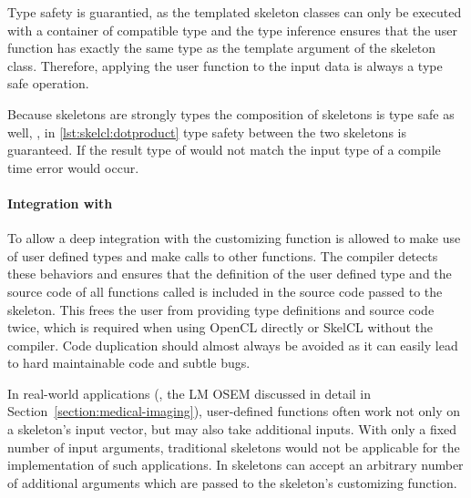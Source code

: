 Type safety is guarantied, as the templated skeleton classes can only be executed with a container of compatible type and the type inference ensures that the user function has exactly the same type as the template argument of the skeleton class.
Therefore, applying the user function to the input data is always a type safe operation.

Because skeletons are strongly types the composition of skeletons is type safe as well, \ie, in \autoref{lst:skelcl:dotproduct} type safety between the two skeletons is guaranteed.
If the result type of  would not match the input type of  a compile time error would occur.

\paragraph{Integration with \Cpp}
To allow a deep integration with \Cpp the customizing function is allowed to make use of user defined types and make calls to other functions.
The  compiler detects these behaviors and ensures that the definition of the user defined type and the source code of all functions called is included in the source code passed to the skeleton.
This frees the user from providing type definitions and source code twice, which is required when using OpenCL directly or SkelCL without the  compiler.
Code duplication should almost always be avoided as it can easily lead to hard maintainable code and subtle bugs.

In real-world applications (\eg, the LM OSEM discussed in detail in Section~\ref{section:medical-imaging}), user-defined functions often work not only on a skeleton's input vector, but may also take additional inputs.
With only a fixed number of input arguments, traditional skeletons would not be applicable for the implementation of such applications.
In \SkelCL skeletons can accept an arbitrary number of additional arguments which are passed to the skeleton's customizing function.

